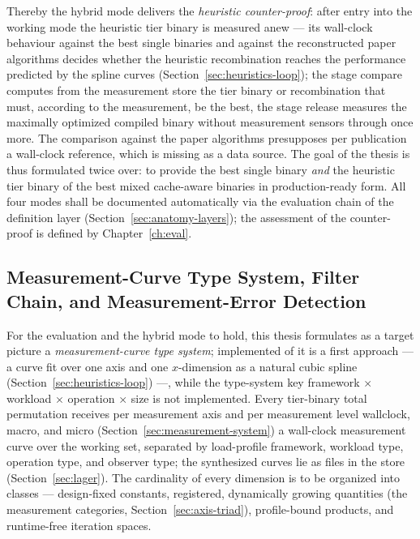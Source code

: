 \begin{nurkurz}
Thereby the hybrid mode delivers the \emph{heuristic counter-proof}: after entry into the working mode
the heuristic tier binary is measured anew --- its wall-clock behaviour against the best single
binaries and against the reconstructed paper algorithms decides whether the heuristic recombination
reaches the performance predicted by the spline curves (Section~\ref{sec:heuristics-loop}); the stage
compare computes from the measurement store the tier binary or recombination that must, according to
the measurement, be the best, the stage release measures the maximally optimized compiled binary
without measurement sensors through once more. The comparison against the paper algorithms presupposes
per publication a wall-clock reference, which is missing as a data source. The goal of the thesis is
thus formulated twice over: to provide the best single binary \emph{and} the heuristic tier binary of
the best mixed cache-aware binaries in production-ready form. All four modes shall be documented
automatically via the evaluation chain of the definition layer (Section~\ref{sec:anatomy-layers}); the
assessment of the counter-proof is defined by Chapter~\ref{ch:eval}.
\subsection{Measurement-Curve Type System, Filter Chain, and Measurement-Error Detection}\label{sec:heuristics-curves}
For the evaluation and the hybrid mode to hold, this thesis formulates as a target picture a
\emph{measurement-curve type system}; implemented of it is a first approach --- a curve fit over one
axis and one $x$-dimension as a natural cubic spline (Section~\ref{sec:heuristics-loop}) ---, while the
type-system key framework $\times$ workload $\times$ operation $\times$ size is not implemented. Every
tier-binary total permutation receives per measurement axis and per measurement level wallclock, macro,
and micro (Section~\ref{sec:measurement-system}) a wall-clock measurement curve over the working set,
separated by load-profile framework, workload type, operation type, and observer type; the synthesized
curves lie as files in the store (Section~\ref{sec:lager}). The cardinality of every dimension is to be
organized into classes --- design-fixed constants, registered, dynamically growing quantities (the
measurement categories, Section~\ref{sec:axis-triad}), profile-bound products, and runtime-free
iteration spaces.


\end{nurkurz}
